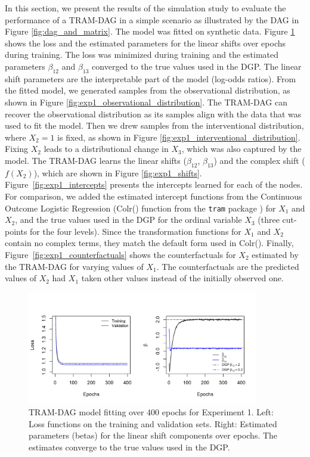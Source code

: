 In this section, we present the results of the simulation study to evaluate the performance of a TRAM-DAG in a simple scenario as illustrated by the DAG in Figure \ref{fig:dag_and_matrix}. The model was fitted on synthetic data. Figure \ref{fig:exp1_loss_parameters} shows the loss and the estimated parameters for the linear shifts over epochs during training. The loss was minimized during training and the estimated parameters $\beta_{12}$ and $\beta_{13}$ converged to the true values used in the DGP. The linear shift parameters are the interpretable part of the model (log-odds ratios). 
From the fitted model, we generated samples from the observational distribution, as shown in Figure \ref{fig:exp1_observational_distribution}. The TRAM-DAG can recover the observational distribution as its samples align with the data that was used to fit the model. Then we drew samples from the interventional distribution, where $X_2 = 1$ is fixed, as shown in Figure \ref{fig:exp1_interventional_distribution}. Fixing $X_2$ leads to a distributional change in $X_3$, which was also captured by the model. The TRAM-DAG learns the linear shifts ($\beta_{12}$, $\beta_{13}$) and the complex shift ($f(X_2)$), which are shown in Figure \ref{fig:exp1_shifts}. Figure~\ref{fig:exp1_intercepts} presents the intercepts learned for each of the nodes. For comparison, we added the estimated intercept functions from the Continuous Outcome Logistic Regression (Colr() function from the \texttt{tram} package \citep{hothorn2018}) for $X_1$ and $X_2$, and the true values used in the DGP for the ordinal variable $X_3$ (three cut-points for the four levels). Since the transformation functions for $X_1$ and $X_2$ contain no complex terms, they match the default form used in Colr(). Finally, Figure~\ref{fig:exp1_counterfactuals} shows the counterfactuals for $X_2$ estimated by the TRAM-DAG for varying values of $X_1$. The counterfactuals are the predicted values of $X_2$ had $X_1$ taken other values instead of the initially observed one. 

\begin{figure}[htbp]
\centering
\includegraphics[width=0.9\textwidth]{img/exp1_loss_parameters.png}
\caption{TRAM-DAG model fitting over 400 epochs for Experiment 1. Left: Loss functions on the training and validation sets. Right: Estimated parameters (betas) for the linear shift components over epochs. The estimates converge to the true values used in the DGP.}
\label{fig:exp1_loss_parameters}
\end{figure}



